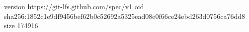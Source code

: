 version https://git-lfs.github.com/spec/v1
oid sha256:1852c1e9df9456bef62b0c52692a5325ead08e0f66ce24ebd263d0756ca76dd8
size 174916
